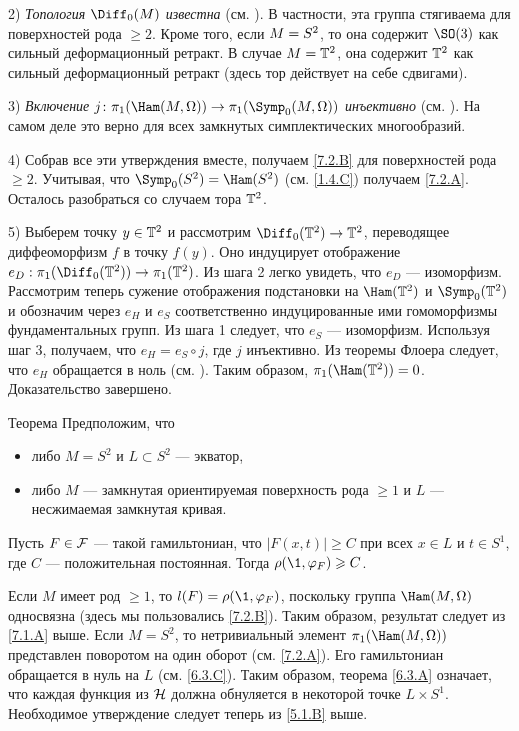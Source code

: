 2) \textit{Топология $\Diff_0 (M)$ известна} (см. \cite{EE}).
В частности, эта группа стягиваема для поверхностей рода $\ge 2$.
Кроме того, если $M \z= S^2$, то она содержит $\SO (3)$ как сильный
деформационный ретракт. 
В случае $M = \mathbb{T}^2$, она содержит $\mathbb{T}^2$ как сильный деформационный
ретракт (здесь тор действует на себе сдвигами). 

3) \textit{Включение $j\: \pi_1 (\Ham (M, \Omega)) \to \pi_1 (\Symp_0 (M,
\Omega))$ инъективно} (см. \cite[10.18 iii]{MS}). 
На самом деле это верно для всех замкнутых симплектических многообразий.

4) Собрав все эти утверждения вместе, получаем \ref{7.2.B} для
поверхностей рода $\ge 2$. 
Учитывая, что $\Symp_0 (S^2) = \Ham (S^2)$ (см. \ref{1.4.C}) получаем
\ref{7.2.A}. 
Осталось разобраться со случаем тора $\mathbb{T}^2$.

5) Выберем точку $y \in \mathbb{T}^2$ и рассмотрим  $\Diff_0 (\TT^2) \to \TT^2$,
переводящее диффеоморфизм $f$ в точку $f(y)$. 
Оно индуцирует отображение $e_D: \pi_1 (\Diff_0 (\TT^2)) \to \pi_1 (\TT^2)$.
Из шага 2 легко увидеть, что $e_D$ — изоморфизм.
Рассмотрим теперь сужение отображения подстановки на $\Ham (\TT^2)$ и
$\Symp_0 (\TT^2)$ и обозначим через $e_H$ и $e_S$ соответственно
индуцированные ими гомоморфизмы фундаментальных групп. 
Из шага 1 следует, что $e_S$ — изоморфизм.
Используя шаг 3, получаем, что $e_H = e_S \circ j$, где $j$ инъективно.
Из теоремы Флоера следует, что $e_H$ обращается в ноль (см. \cite{LMP1}).
Таким образом, $\pi_1 (\Ham (\TT^2)) = 0$. 
Доказательство завершено. 
\qeds

\begin{thm}[(\cite{P5})]{Теорема}\label{7.2.C}
Предположим, что 
\begin{itemize}
\item либо $M = S^2$ и $L \subset S^2$ — экватор, 
\item либо $M$ — замкнутая ориентируемая поверхность рода $\ge 1$ и $L$ — несжимаемая замкнутая кривая.
\end{itemize}
Пусть $F \in \mathcal{F}$ — такой гамильтониан, что $|F(x,t)| \ge C$ при всех $x \in L$ и $t \in S^1$, где $C$ — положительная постоянная.
Тогда $\rho (\1, \phi_F) \z\ge C$.
\end{thm}

Если $M$ имеет род $\ge 1$, то $l (F) = \rho (\1, \phi_F)$, поскольку группа $\Ham (M, \Omega)$ односвязна (здесь мы пользовались \ref{7.2.B}).
Таким образом, результат следует из \ref{7.1.A} выше.
Если $M = S^2$, то нетривиальный элемент $\pi_1 (\Ham (M, \Omega))$ представлен поворотом на один оборот (см. \ref{7.2.A}).
Его гамильтониан обращается в нуль на $L$ (см. \ref{6.3.C}).
Таким образом, теорема \ref{6.3.A} означает, что каждая функция из $\mathcal{H}$ должна обнуляется в некоторой точке $L \times S^1$.
Необходимое утверждение следует теперь из \ref{5.1.B} выше.
\qeds

